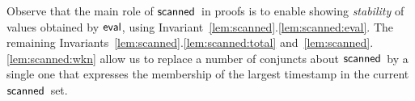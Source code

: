 
Observe that the main role of $\scanned$ in proofs is to enable
showing \emph{stability} of values obtained by $\mathsf{eval}$, using
Invariant~\ref{lem:scanned}.\ref{lem:scanned:eval}. The remaining
Invariants~\ref{lem:scanned}.\ref{lem:scanned:total}
and~\ref{lem:scanned}.\ref{lem:scanned:wkn} allow us to replace a
number of conjuncts about $\scanned$ by a single one that expresses
the membership of the largest timestamp in the current $\scanned$ set.

\begin{comment}

\begin{figure}
\[
\begin{array}{r l}
  \num{1} & \specK{\{\ \histS = \hempty \}} \\
  \num{2} & \specK{\{\ \histS = \hempty \wedge
    w = \stableorder \wedge h = \hist \}} \\
  \num{3} & r_1 \tbnd \esc{scan};\\
   \num{4} & \specK{\{ \exists\, t_1\ldot\,
       \histS = \hempty \wedge h \subseteq \hist \wedge
       w \subseteq \stableorder \wedge
      \dom{h} \subseteq \ideal{\stableorder}{t_1} \wedge}\\
          & \specK{\hphantom{\{ \exists\, t_1\ldot}\,
        t_1 \in \scanned{\stableorder}  \wedge
        r_1 = \eval\, t_s\, \stableorder\, \hist\}}\\
   \num{5} & \specK{\{ \exists\, t_1\ldot\,
       \histS = \hempty \wedge j = \hist \wedge h \subseteq j \wedge
       s = \stableorder \wedge w \subseteq s \wedge
      \dom{h} \subseteq \ideal{s}{t} \wedge }\\
          & \specK{\hphantom{\{\ \exists\, t_1\ldot}\,
        t_1 \in \scanned s \wedge r_1 = \eval\, t_1\, s\, j\}}\\
  \num{6} & r_2 \tbnd \esc{scan};\\
  \num{7} & \specK{\{ \exists\, t_1\, t_2\ldot\,
     \histS = \hempty \wedge
     h \subseteq j \subseteq \hist \wedge
      w \subseteq s  \subseteq \stableorder \wedge
      \dom{h} \subseteq \ideal{s}{t_1} \wedge}\\
      & \specK{\hphantom{\{ \exists\, t_1\, t_2\ldot}\,
      t_1 \in \scanned s \wedge r_1 = \eval\, t_1\, s\, j \wedge
      \wedge \ideal{s}{t_1} = \ideal{\stableorder}{t_1}\wedge}\\
      & \specK{\hphantom{\{ \exists\, t_1\, t_2\ldot}\,

\end{comment}
